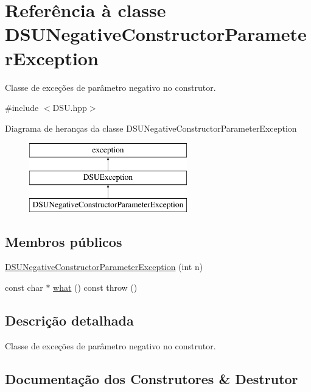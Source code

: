 \hypertarget{classDSUNegativeConstructorParameterException}{}\section{Referência à classe D\+S\+U\+Negative\+Constructor\+Parameter\+Exception}
\label{classDSUNegativeConstructorParameterException}


Classe de exceções de parâmetro negativo no construtor.  




{\ttfamily \#include $<$D\+S\+U.\+hpp$>$}

Diagrama de heranças da classe D\+S\+U\+Negative\+Constructor\+Parameter\+Exception\begin{figure}[H]
\begin{center}
\leavevmode
\includegraphics[height=3.000000cm]{classDSUNegativeConstructorParameterException}
\end{center}
\end{figure}
\subsection*{Membros públicos}
\begin{DoxyCompactItemize}
\item 
\hyperlink{classDSUNegativeConstructorParameterException_a4d71581d8012d2d39ded7b6e240bc7e5}{D\+S\+U\+Negative\+Constructor\+Parameter\+Exception} (int n)
\item 
const char $\ast$ \hyperlink{classDSUNegativeConstructorParameterException_a16a3dcf8c0aeca0c1158ee18dd2a0c0f}{what} () const  throw ()
\end{DoxyCompactItemize}


\subsection{Descrição detalhada}
Classe de exceções de parâmetro negativo no construtor. 

\subsection{Documentação dos Construtores \& Destrutor}
\mbox{\label{classDSUNegativeConstructorParameterException_a4d71581d8012d2d39ded7b6e240bc7e5}} 
